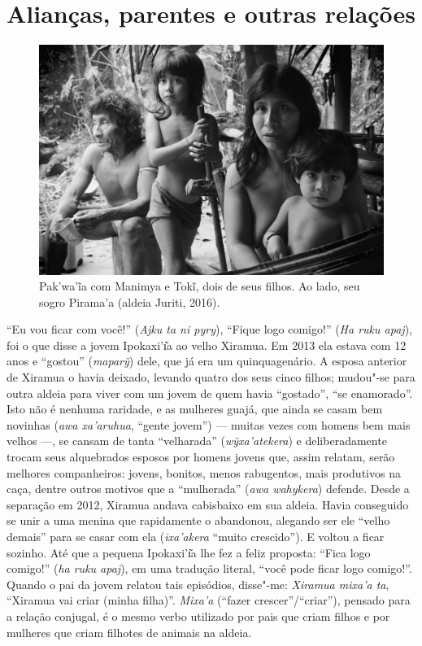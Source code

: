 
\chapter{Alianças, parentes e outras relações}\label{alianuxe7as-parentes-e-outras-relauxe7uxf5es}

\begin{figure}[H]
\centering
  \includegraphics[width=\textwidth]{./imgs/IMG_4928}
\caption{Pak'wa'ĩa com Manimya e Tokĩ, dois de seus filhos. Ao lado, seu sogro Pirama’a (aldeia Juriti,
2016).}
\end{figure}

\noindent ``Eu vou ficar com você!'' (\emph{Ajku ta ni pyry}), ``Fique logo comigo!''
(\emph{Ha ruku apaj}), foi o que disse a jovem Ipokaxi'ı͂a ao velho
Xiramua. Em 2013 ela estava com 12 anos e ``gostou'' (\emph{maparỹ}) dele,
que já era um quinquagenário. A esposa anterior de Xiramua o havia
deixado, levando quatro dos seus cinco filhos; mudou"-se para outra
aldeia para viver com um jovem de quem havia ``gostado'', ``se enamorado''.
Isto não é nenhuma raridade, e as mulheres guajá, que ainda se casam bem
novinhas (\emph{awa xa'aruhua}, ``gente jovem'') --- muitas vezes com homens
bem mais velhos ---, se cansam de tanta ``velharada'' (\emph{wỹxa'atekera})
e deliberadamente trocam seus alquebrados esposos por homens jovens que,
assim relatam, serão melhores companheiros: jovens, bonitos, menos
rabugentos, mais produtivos na caça, dentre outros motivos que a
``mulherada'' (\emph{awa wahykera}) defende. Desde a separação em 2012,
Xiramua andava cabisbaixo em sua aldeia. Havia conseguido se unir a uma
menina que rapidamente o abandonou, alegando ser ele ``velho demais'' para
se casar com ela (\emph{ixa'akera} ``muito crescido''). E voltou a ficar
sozinho. Até que a pequena Ipokaxi'ı͂a lhe fez a feliz proposta: ``Fica
logo comigo!'' (\emph{ha ruku apaj}), em uma tradução literal, ``você pode
ficar logo comigo!''. Quando o pai da jovem relatou tais episódios,
disse"-me: \emph{Xiramua mixa'a ta}, ``Xiramua vai criar (minha filha)''.
\emph{Mixa'a} (``fazer crescer''/``criar''), pensado para a relação
conjugal, é o mesmo verbo utilizado por pais que criam filhos e por
mulheres que criam filhotes de animais na aldeia.

